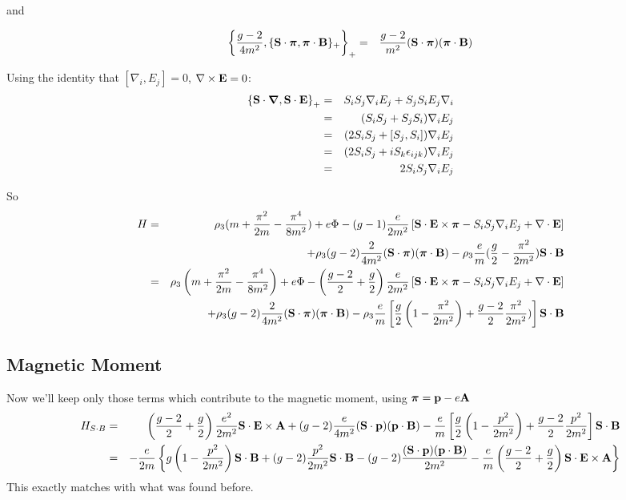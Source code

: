 and

\begin{eqnarray*}
\left \{ \frac{g-2}{4m^2}, 
			\{\mathbf{S} \cdot \mbox{\boldmath$ \pi $}, \mbox{\boldmath$ \pi $} \cdot \mathbf{B} \}_+ \right \}_+
	&=&		\frac{g-2}{m^2} (\mathbf{S} \cdot \mbox{\boldmath$ \pi $}) (\mbox{\boldmath$ \pi $} \cdot \mathbf{B})
\end{eqnarray*} 

Using the identity that $[\nabla_i, E_j]=0$, $\mathbf{\nabla} \times \mathbf{E} = 0$:
 \begin{eqnarray*}
 \left \{ \mathbf{S} \cdot \mbox{\boldmath$ \nabla $}, \mathbf{S} \cdot \mathbf{E} \right \}_+
	&=& S_i S_j \nabla_i E_j + S_j S_i E_j \nabla_i	\\
	&=& (S_i S_j + S_j S_i) \nabla_i E_j			\\
	&=& (2S_i S_j + [S_j, S_i])\nabla_i E_j			\\
	&=& (2S_i S_j +iS_k\epsilon_{ijk})\nabla_i E_j	\\
	&=& 2S_i S_j\nabla_i E_j
 \end{eqnarray*}
 
So
\begin{eqnarray*}
H 	&=& \rho_3 (m + \frac{\pi^2}{2m} - \frac{\pi^4}{8m^2})  + e\Phi - (g-1)\frac{e}{2m^2} 
		\left [ 
			 \mathbf{S} \cdot \mathbf{E} \times \mbox{\boldmath$ \pi $}
			-S_i S_j \nabla_i E_j 
			+\mathbf{\nabla} \cdot \mathbf{E}	
		\right ]
	\\&&
		+ \rho_3 (g-2)\frac{2}{4m^2} (\mathbf{S} \cdot \mbox{\boldmath$ \pi $}) (\mbox{\boldmath$ \pi $} \cdot \mathbf{B})
		- \rho_3 \frac{e}{m}(\frac{g}{2} - \frac{\pi^2}{2m^2}) \mathbf{S} \cdot \mathbf{B}	\\
	&=& \rho_3 \left(m + \frac{\pi^2}{2m} - \frac{\pi^4}{8m^2} \right)  + e\Phi - \left(\frac{g-2}{2} + \frac{g}{2}\right)\frac{e}{2m^2} 
		\left [ 
			 \mathbf{S} \cdot \mathbf{E} \times \mbox{\boldmath$ \pi $}
			-S_i S_j \nabla_i E_j 
			+\mathbf{\nabla} \cdot \mathbf{E}	
		\right ]	
	\\&&
		+ \rho_3 (g-2)\frac{2}{4m^2} (\mathbf{S} \cdot \mbox{\boldmath$ \pi $}) (\mbox{\boldmath$ \pi $} \cdot \mathbf{B})
		- \rho_3 \frac{e}{m}\left [\frac{g}{2}\left(1 - \frac{\pi^2}{2m^2}\right) + \frac{g-2}{2}\frac{\pi^2}{2m^2}) \right] \mathbf{S} \cdot \mathbf{B}							
\end{eqnarray*}

\subsection*{Magnetic Moment}
Now we'll keep only those terms which contribute to the magnetic moment, using $\mbox{\boldmath$ \pi $} = \mathbf{p} - e\mathbf{A}$
\begin{eqnarray*}
H_{S\cdot B}	&=&
		 \left(\frac{g-2}{2} + 	\frac{g}{2}\right)\frac{e^2}{2m^2} \mathbf{S} \cdot \mathbf{E} \times \mathbf{A}
		+  (g-2)\frac{e}{4m^2} (\mathbf{S} \cdot \mathbf{p}) (\mathbf{p} \cdot \mathbf{B})
		-  \frac{e}{m}\left [\frac{g}{2}\left(1 - \frac{p^2}{2m^2}\right) + \frac{g-2}{2}\frac{p^2}{2m^2} \right] \mathbf{S} 		\cdot \mathbf{B}		\\
	&=&		-\frac{e}{2m} \left\{
			g \left(1 - \frac{p^2}{2m^2}\right)  \mathbf{S} \cdot \mathbf{B}	
			+(g-2) \frac{p^2}{2m^2} \mathbf{S} \cdot \mathbf{B}	
			-(g-2) \frac{ (\mathbf{S} \cdot \mathbf{p}) (\mathbf{p} \cdot \mathbf{B})}{2m^2}
			-\frac{e}{m} \left(\frac{g-2}{2} + 	\frac{g}{2}\right) \mathbf{S} \cdot \mathbf{E} \times \mathbf{A}
		\right\}
\end{eqnarray*}
This exactly matches with what was found before.



